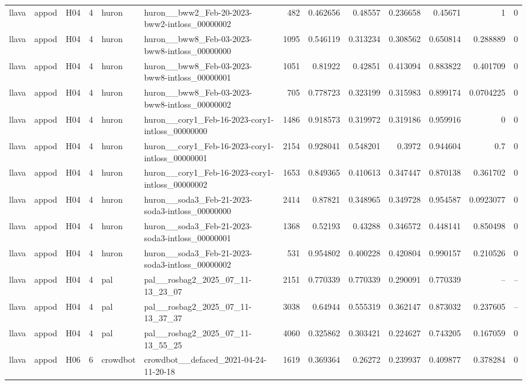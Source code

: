 \begin{longtable}{lllrllrrrrrrr}
llava & appod & H04 & 4 & huron & huron\_\_bww2\_Feb-20-2023-bww2-intloss\_00000002 & 482 & 0.462656 & 0.48557 & 0.236658 & 0.45671 & 1 & 0 \\
llava & appod & H04 & 4 & huron & huron\_\_bww8\_Feb-03-2023-bww8-intloss\_00000000 & 1095 & 0.546119 & 0.313234 & 0.308562 & 0.650814 & 0.288889 & 0 \\
llava & appod & H04 & 4 & huron & huron\_\_bww8\_Feb-03-2023-bww8-intloss\_00000001 & 1051 & 0.81922 & 0.42851 & 0.413094 & 0.883822 & 0.401709 & 0 \\
llava & appod & H04 & 4 & huron & huron\_\_bww8\_Feb-03-2023-bww8-intloss\_00000002 & 705 & 0.778723 & 0.323199 & 0.315983 & 0.899174 & 0.0704225 & 0 \\
llava & appod & H04 & 4 & huron & huron\_\_cory1\_Feb-16-2023-cory1-intloss\_00000000 & 1486 & 0.918573 & 0.319972 & 0.319186 & 0.959916 & 0 & 0 \\
llava & appod & H04 & 4 & huron & huron\_\_cory1\_Feb-16-2023-cory1-intloss\_00000001 & 2154 & 0.928041 & 0.548201 & 0.3972 & 0.944604 & 0.7 & 0 \\
llava & appod & H04 & 4 & huron & huron\_\_cory1\_Feb-16-2023-cory1-intloss\_00000002 & 1653 & 0.849365 & 0.410613 & 0.347447 & 0.870138 & 0.361702 & 0 \\
llava & appod & H04 & 4 & huron & huron\_\_soda3\_Feb-21-2023-soda3-intloss\_00000000 & 2414 & 0.87821 & 0.348965 & 0.349728 & 0.954587 & 0.0923077 & 0 \\
llava & appod & H04 & 4 & huron & huron\_\_soda3\_Feb-21-2023-soda3-intloss\_00000001 & 1368 & 0.52193 & 0.43288 & 0.346572 & 0.448141 & 0.850498 & 0 \\
llava & appod & H04 & 4 & huron & huron\_\_soda3\_Feb-21-2023-soda3-intloss\_00000002 & 531 & 0.954802 & 0.400228 & 0.420804 & 0.990157 & 0.210526 & 0 \\
llava & appod & H04 & 4 & pal & pal\_\_rosbag2\_2025\_07\_11-13\_23\_07 & 2151 & 0.770339 & 0.770339 & 0.290091 & 0.770339 & -- & -- \\
llava & appod & H04 & 4 & pal & pal\_\_rosbag2\_2025\_07\_11-13\_37\_37 & 3038 & 0.64944 & 0.555319 & 0.362147 & 0.873032 & 0.237605 & -- \\
llava & appod & H04 & 4 & pal & pal\_\_rosbag2\_2025\_07\_11-13\_55\_25 & 4060 & 0.325862 & 0.303421 & 0.224627 & 0.743205 & 0.167059 & 0 \\
llava & appod & H06 & 6 & crowdbot & crowdbot\_\_defaced\_2021-04-24-11-20-18 & 1619 & 0.369364 & 0.26272 & 0.239937 & 0.409877 & 0.378284 & 0 \\

\end{longtable}

